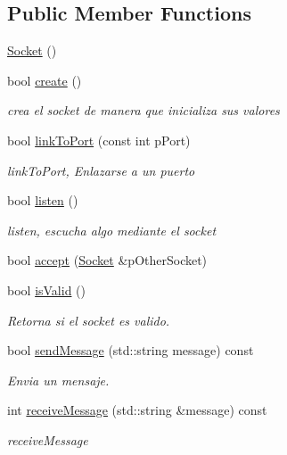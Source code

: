 \subsection*{Public Member Functions}
\begin{DoxyCompactItemize}
\item 
\hyperlink{class_socket_a7c3256c4fc6e2c603df73201049fae5a}{Socket} ()
\item 
bool \hyperlink{class_socket_a6afde2dca985dacdfa770141192e2daf}{create} ()
\begin{DoxyCompactList}\small\item\em crea el socket de manera que inicializa sus valores \end{DoxyCompactList}\item 
bool \hyperlink{class_socket_a77afe3664d8996221a5d9a08a0330778}{link\-To\-Port} (const int p\-Port)
\begin{DoxyCompactList}\small\item\em link\-To\-Port, Enlazarse a un puerto \end{DoxyCompactList}\item 
bool \hyperlink{class_socket_ac841ace3ba3f3b0daa9b59a498d3769c}{listen} ()
\begin{DoxyCompactList}\small\item\em listen, escucha algo mediante el socket \end{DoxyCompactList}\item 
bool \hyperlink{class_socket_a0d133d518a86bfae2db9095c587aa4e3}{accept} (\hyperlink{class_socket}{Socket} \&p\-Other\-Socket)
\item 
bool \hyperlink{class_socket_a5ccaf81da2b6f25dded056e6dbf7f410}{is\-Valid} ()
\begin{DoxyCompactList}\small\item\em Retorna si el socket es valido. \end{DoxyCompactList}\item 
bool \hyperlink{class_socket_a5d4ef6f01022b2653aad96868bd87999}{send\-Message} (std\-::string message) const 
\begin{DoxyCompactList}\small\item\em Envia un mensaje. \end{DoxyCompactList}\item 
int \hyperlink{class_socket_a80aef7d019680c494f45cbd5b7fa37f2}{receive\-Message} (std\-::string \&message) const 
\begin{DoxyCompactList}\small\item\em receive\-Message \end{DoxyCompactList}\item 

\end{DoxyCompactItemize}
